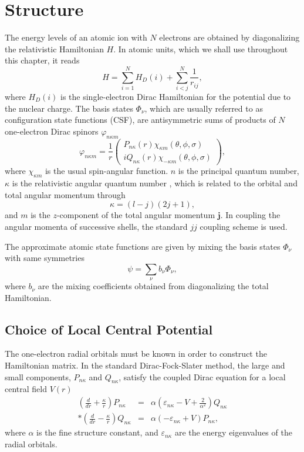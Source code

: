 \section{Structure}
\label{sec:structure}
The energy levels of an atomic ion with $N$ electrons are obtained by
diagonalizing the relativistic Hamiltonian $H$. In atomic units, which we shall
use throughout this chapter, it reads
\begin{equation}
\label{eq_hamilton}
H = \sum_{i=1}^{N} H_{D}(i) + \sum_{i<j}^{N}\frac{1}{r_{ij}},
\end{equation}
where $H_{D}(i)$ is the single-electron Dirac Hamiltonian for the potential
due to the nuclear charge. The basis states $\Phi_{\nu}$, which are usually
referred to as configuration state functions (CSF), are antisymmetric sums of
products of $N$ one-electron Dirac spinors $\varphi_{n\kappa m}$
\begin{equation}
\label{eq_spinor}
\varphi_{n\kappa m} = \frac{1}{r}\left(\begin{array}{c}
P_{n\kappa}(r) \chi_{\kappa m}(\theta, \phi, \sigma)\\
iQ_{n\kappa}(r) \chi_{-\kappa m}(\theta, \phi, \sigma)
\end{array}\right),
\end{equation}
where $\chi_{\kappa m}$ is the usual spin-angular function. $n$ is the
principal quantum number, $\kappa$ is the relativistic angular quantum number
, which is related to the orbital and total angular momentum through
\begin{equation}
\kappa = (l-j)(2j+1),
\end{equation}
and $m$ is the $z$-component of the total angular momentum $\mathbf{j}$. In
coupling the angular momenta of successive shells, the standard $jj$ coupling
scheme is used. 

The approximate atomic state functions are given by mixing the basis
states $\Phi_{\nu}$ with same symmetries
\begin{equation}
\label{eq_asf}
\psi = \sum_{\nu} b_{\nu} \Phi_{\nu},
\end{equation}
where $b_{\nu}$ are the mixing coefficients obtained from diagonalizing the
total Hamiltonian. 

\subsection{Choice of Local Central Potential}
The one-electron radial orbitals must be known in order to construct the
Hamiltonian matrix. In the standard Dirac-Fock-Slater method, the large and
small components, $P_{n\kappa}$ and $Q_{n\kappa}$, satisfy the coupled Dirac
equation for a local central field $V(r)$
\begin{eqnarray}
\label{eq_dirac}
\left(\frac{d}{d r} + \frac{\kappa}{r}\right)P_{n\kappa} &=&
\alpha\left(\varepsilon_{n\kappa} - V + \frac{2}{\alpha^2}\right)Q_{n\kappa}
\nonumber\\*
\left(\frac{d}{d r} - \frac{\kappa}{r}\right)Q_{n\kappa} &=&
\alpha\left(-\varepsilon_{n\kappa} + V\right)P_{n\kappa},
\end{eqnarray}
where $\alpha$ is the fine structure constant, and $\varepsilon_{n\kappa}$ are
the energy eigenvalues of the radial orbitals.

